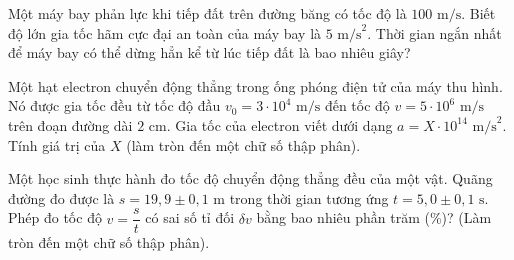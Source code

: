 \begin{ex}
	Một máy bay phản lực khi tiếp đất trên đường băng có tốc độ là $100\text{ m/s}$. Biết độ lớn gia tốc hãm cực đại an toàn của máy bay là $5\text{ m/s}^2$. Thời gian ngắn nhất để máy bay có thể dừng hẳn kể từ lúc tiếp đất là bao nhiêu giây?

	\par{}
\end{ex}

\begin{ex}
	Một hạt electron chuyển động thẳng trong ống phóng điện tử của máy thu hình. Nó được gia tốc đều từ tốc độ đầu $v_0 = 3 \cdot 10^4\text{ m/s}$ đến tốc độ $v = 5 \cdot 10^6\text{ m/s}$ trên đoạn đường dài $2\text{ cm}$. Gia tốc của electron viết dưới dạng $a = X \cdot 10^{14}\text{ m/s}^2$. Tính giá trị của $X$ (làm tròn đến một chữ số thập phân).

	\par{}
\end{ex}

\begin{ex}
	Một học sinh thực hành đo tốc độ chuyển động thẳng đều của một vật. Quãng đường đo được là $s = 19{,}9 \pm 0{,}1\text{ m}$ trong thời gian tương ứng $t = 5{,}0 \pm 0{,}1\text{ s}$. Phép đo tốc độ $v = \dfrac{s}{t}$ có sai số tỉ đối $\delta v$ bằng bao nhiêu phần trăm (\%)? (Làm tròn đến một chữ số thập phân).

	\par{}
\end{ex}


